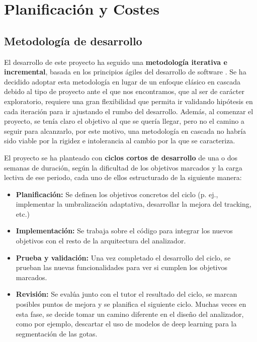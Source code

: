 
\chapter{Planificación y Costes}

\section{Metodología de desarrollo}

El desarrollo de este proyecto ha seguido una \textbf{metodología iterativa e incremental}, basada en los principios ágiles del desarrollo de software \cite{beck2001agile}. Se ha decidido adoptar esta metodología en lugar de un enfoque clásico en cascada debido al tipo de proyecto ante el que nos encontramos, que al ser de carácter exploratorio, requiere una gran flexibilidad que permita ir validando hipótesis en cada iteración para ir ajustando el rumbo del desarrollo. Además, al comenzar el proyecto, se tenía claro el objetivo al que se quería llegar, pero no el camino a seguir para alcanzarlo, por este motivo, una metodología en cascada no habría sido viable por la rigidez e intolerancia al cambio por la que se caracteriza.

El proyecto se ha planteado con \textbf{ciclos cortos de desarrollo} de una o dos semanas de duración, según la dificultad de los objetivos marcados y la carga lectiva de ese periodo, cada uno de ellos estructurado de la siguiente manera:

\begin{itemize}
    \item \textbf{Planificación:} Se definen los objetivos concretos del ciclo (p. ej., implementar la umbralización adaptativa, desarrollar la mejora del tracking, etc.)
    \item \textbf{Implementación:} Se trabaja sobre el código para integrar los nuevos objetivos con el resto de la arquitectura del analizador.
    \item \textbf{Prueba y validación:} Una vez completado el desarrollo del ciclo, se prueban las nuevas funcionalidades para ver si cumplen los objetivos marcados.
    \item \textbf{Revisión:} Se evalúa junto con el tutor el resultado del ciclo, se marcan posibles puntos de mejora y se planifica el siguiente ciclo. Muchas veces en esta fase, se decide tomar un camino diferente en el diseño del analizador, como por ejemplo, descartar el uso de modelos de deep learning para la segmentación de las gotas.
\end{itemize}


